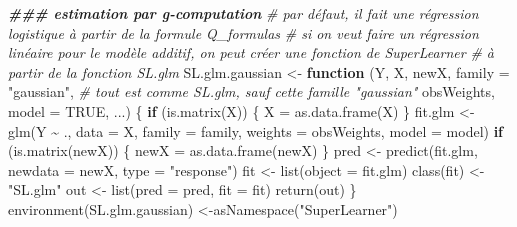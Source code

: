 \documentclass[
]{book}
\newenvironment{Shaded}{\begin{snugshade}}{\end{snugshade}}
\newcommand{\AttributeTok}[1]{\textcolor[rgb]{0.77,0.63,0.00}{#1}}
\newcommand{\CommentTok}[1]{\textcolor[rgb]{0.56,0.35,0.01}{\textit{#1}}}
\newcommand{\ConstantTok}[1]{\textcolor[rgb]{0.00,0.00,0.00}{#1}}
\newcommand{\ControlFlowTok}[1]{\textcolor[rgb]{0.13,0.29,0.53}{\textbf{#1}}}
\newcommand{\DocumentationTok}[1]{\textcolor[rgb]{0.56,0.35,0.01}{\textbf{\textit{#1}}}}
\newcommand{\FunctionTok}[1]{\textcolor[rgb]{0.00,0.00,0.00}{#1}}
\newcommand{\NormalTok}[1]{#1}
\newcommand{\OtherTok}[1]{\textcolor[rgb]{0.56,0.35,0.01}{#1}}
\newcommand{\SpecialCharTok}[1]{\textcolor[rgb]{0.00,0.00,0.00}{#1}}
\newcommand{\StringTok}[1]{\textcolor[rgb]{0.31,0.60,0.02}{#1}}
\begin{document}
\begin{Shaded}
\begin{Highlighting}[]
\DocumentationTok{\#\#\# estimation par g{-}computation}
  \CommentTok{\# par défaut, il fait une régression logistique à partir de la formule Q\_formulas}
  \CommentTok{\# si on veut faire un régression linéaire pour le modèle additif, on peut créer une fonction de SuperLearner}
  \CommentTok{\# à partir de la fonction SL.glm}
\NormalTok{  SL.glm.gaussian }\OtherTok{\textless{}{-}} \ControlFlowTok{function}\NormalTok{ (Y, X, newX,}
                               \AttributeTok{family =} \StringTok{"gaussian"}\NormalTok{,}
                               \CommentTok{\# tout est comme SL.glm, sauf cette famille "gaussian"}
\NormalTok{                               obsWeights, }\AttributeTok{model =} \ConstantTok{TRUE}\NormalTok{, ...) \{}
  \ControlFlowTok{if}\NormalTok{ (}\FunctionTok{is.matrix}\NormalTok{(X)) \{}
\NormalTok{    X }\OtherTok{=} \FunctionTok{as.data.frame}\NormalTok{(X)}
\NormalTok{  \}}
\NormalTok{  fit.glm }\OtherTok{\textless{}{-}} \FunctionTok{glm}\NormalTok{(Y }\SpecialCharTok{\textasciitilde{}}\NormalTok{ ., }\AttributeTok{data =}\NormalTok{ X, }\AttributeTok{family =}\NormalTok{ family, }\AttributeTok{weights =}\NormalTok{ obsWeights,}
                 \AttributeTok{model =}\NormalTok{ model)}
  \ControlFlowTok{if}\NormalTok{ (}\FunctionTok{is.matrix}\NormalTok{(newX)) \{}
\NormalTok{    newX }\OtherTok{=} \FunctionTok{as.data.frame}\NormalTok{(newX)}
\NormalTok{  \}}
\NormalTok{  pred }\OtherTok{\textless{}{-}} \FunctionTok{predict}\NormalTok{(fit.glm, }\AttributeTok{newdata =}\NormalTok{ newX, }\AttributeTok{type =} \StringTok{"response"}\NormalTok{)}
\NormalTok{  fit }\OtherTok{\textless{}{-}} \FunctionTok{list}\NormalTok{(}\AttributeTok{object =}\NormalTok{ fit.glm)}
  \FunctionTok{class}\NormalTok{(fit) }\OtherTok{\textless{}{-}} \StringTok{"SL.glm"}
\NormalTok{  out }\OtherTok{\textless{}{-}} \FunctionTok{list}\NormalTok{(}\AttributeTok{pred =}\NormalTok{ pred, }\AttributeTok{fit =}\NormalTok{ fit)}
  \FunctionTok{return}\NormalTok{(out)}
\NormalTok{\}}
\FunctionTok{environment}\NormalTok{(SL.glm.gaussian) }\OtherTok{\textless{}{-}}\FunctionTok{asNamespace}\NormalTok{(}\StringTok{"SuperLearner"}\NormalTok{)}


\end{Highlighting}
\end{Shaded}
\end{document}
